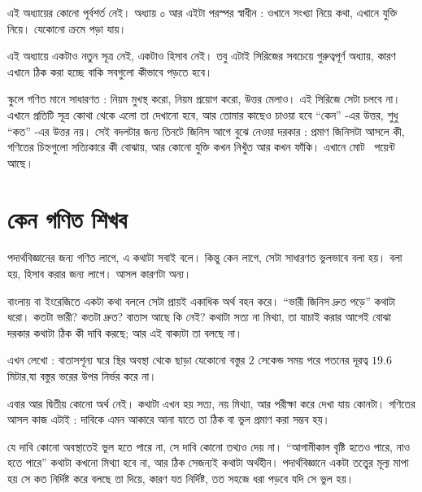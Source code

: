 \documentclass[11pt]{article}
\begin{document}

\noindent
এই অধ্যায়ের কোনো পূর্বশর্ত নেই। অধ্যায় ০ আর এইটা পরস্পর স্বাধীন :
ওখানে সংখ্যা নিয়ে কথা, এখানে যুক্তি নিয়ে। যেকোনো ক্রমে পড়া যায়।

\noindent
এই অধ্যায়ে একটাও নতুন সূত্র নেই, একটাও হিসাব নেই। তবু এটাই সিরিজের সবচেয়ে
গুরুত্বপূর্ণ অধ্যায়, কারণ এখানে ঠিক করা হচ্ছে বাকি সবগুলো কীভাবে পড়তে হবে।

\noindent
স্কুলে গণিত মানে সাধারণত : নিয়ম মুখস্থ করো, নিয়ম প্রয়োগ করো, উত্তর মেলাও।
এই সিরিজে সেটা চলবে না। এখানে প্রতিটি সূত্র কোথা থেকে এলো তা দেখানো হবে, আর
তোমার কাছেও চাওয়া হবে ``কেন'' -এর উত্তর, শুধু ``কত'' -এর উত্তর নয়। সেই বদলটার জন্য
তিনটে জিনিস আগে বুঝে নেওয়া দরকার : প্রমাণ জিনিসটা আসলে কী, গণিতের চিহ্নগুলো
সত্যিকারে কী বোঝায়, আর কোনো যুক্তি কখন নিখুঁত আর কখন ফাঁকি। এখানে মোট
\totalpoints\ পয়েন্ট আছে।

\section{কেন গণিত শিখব}

\noindent
পদার্থবিজ্ঞানের জন্য গণিত লাগে, এ কথাটা সবাই বলে। কিন্তু কেন লাগে, সেটা
সাধারণত ভুলভাবে বলা হয়। বলা হয়, হিসাব করার জন্য লাগে। আসল কারণটা অন্য।

\begin{idea}[গণিত হিসাবের যন্ত্র নয়, নিখুঁত করে বলার ভাষা]
বাংলায় বা ইংরেজিতে একটা কথা বললে সেটা প্রায়ই একাধিক অর্থ বহন করে। ``ভারী
জিনিস দ্রুত পড়ে'' কথাটা ধরো। কতটা ভারী? কতটা দ্রুত? বাতাস আছে কি নেই? কথাটা
সত্য না মিথ্যা, তা যাচাই করার আগেই বোঝা দরকার কথাটা ঠিক কী দাবি করছে; আর
এই বাক্যটা তা বলছে না।

এখন লেখো : বাতাসশূন্য ঘরে স্থির অবস্থা থেকে ছাড়া যেকোনো বস্তুর $2$ সেকেন্ড সময় পরে
পতনের দূরত্ব $19.6$ মিটার,যা বস্তুর ভরের উপর নির্ভর করে না।

এবার আর দ্বিতীয় কোনো অর্থ নেই। কথাটা এখন হয় সত্য, নয় মিথ্যা, আর পরীক্ষা করে
দেখা যায় কোনটা। গণিতের আসল কাজ এটাই : দাবিকে এমন আকারে আনা যাতে তা ঠিক বা ভুল প্রমাণ করা সম্ভব হয়।
\end{idea}

\begin{remark}
যে দাবি কোনো অবস্থাতেই ভুল হতে পারে না, সে দাবি কোনো তথ্যও দেয় না। ``আগামীকাল
বৃষ্টি হতেও পারে, নাও হতে পারে'' কথাটা কখনো মিথ্যা হবে না, আর ঠিক সেজন্যই কথাটা
অর্থহীন। পদার্থবিজ্ঞানে একটা তত্ত্বের মূল্য মাপা হয় সে কত নির্দিষ্ট করে বলছে
তা দিয়ে, কারণ যত নির্দিষ্ট, তত সহজে ধরা পড়বে যদি সে ভুল হয়।
\end{remark}
\end{document}

